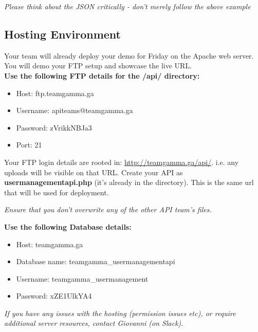 \documentclass{article}
\begin{document}
\begin{center}
   \textit{Please think about the JSON critically - don't merely follow the above example}
\end{center}

\newpage
\subsection{Hosting Environment}
Your team will already deploy your demo for Friday on the Apache web server. You will demo your FTP setup and showcase the live URL.\\

\textbf{Use the following FTP details for the /api/ directory:} 

\begin{itemize}
\begin{itemize}
\item Host: ftp.teamgamma.ga
\item Username: apiteams@teamgamma.ga
\item Password: zVrikkNBJa3
\item Port: 21
\end{itemize}
\end{itemize}

Your FTP login details are rooted in: \url{http://teamgamma.ga/api/}. i.e. any uploads will be visible on that URL. Create your API as \textbf{usermanagementapi.php} (it's already in the directory). This is the same url that will be used for deployment.

\begin{center}
   \textit{Ensure that you don't overwrite any of the other API team's files.}
\end{center}

\textbf{Use the following Database details:} 

\begin{itemize}
    \begin{itemize}
        \item Host: teamgamma.ga
        \item Database name: teamgamma\_usermanagementapi
        \item Username: teamgamma\_usermanagement
        \item Password: xZE1UlkYA4
    \end{itemize}
\end{itemize}

\begin{center}
   \textit{If you have any issues with the hosting (permission issues etc), or require additional server resources, contact Giovanni (on Slack).}
\end{center}
\end{document}

